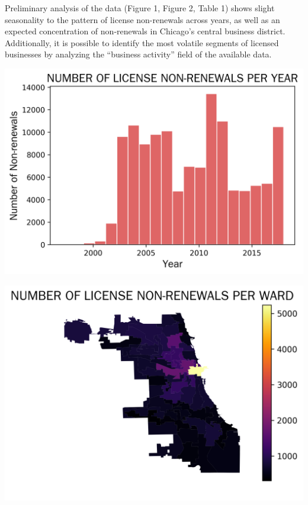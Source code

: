 Preliminary analysis of the data (Figure 1, Figure 2, Table 1) shows slight seasonality to the pattern of license non-renewals across years, as well as an expected concentration of non-renewals in Chicago's central business district. Additionally, it is possible to identify the most volatile segments of licensed businesses by analyzing the “business activity” field of the available data.

%

\begin{minipage}[t]{0.4\pagewidth}
\vspace{0pt}
\includegraphics[scale=0.5]{../../explorations/non-renewals-over-time.png}\\
\end{minipage}\hfill\begin{minipage}[t]{0.4\pagewidth}
\vspace{0pt}
\includegraphics[scale=0.5]{../../explorations/failure-choropleth.png}\\
\end{minipage}
